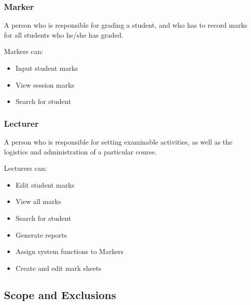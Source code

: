 \documentclass[a4paper]{article}
\begin{document}
			\subsubsection{Marker}
				\begin{flushleft}
				A person who is responsible for grading a student, and who has to record marks for all students who he/she has graded. \linebreak 
				
				Markers can:
				\end{flushleft}
				\begin{itemize}

					\item{Input student marks}
					
					\item{View session marks}
					
					\item{Search for student}

				\end{itemize}
				
			\subsubsection{Lecturer}
				\begin{flushleft}
				A person who is responsible for setting examinable activities, as well as the logistics and administration of a particular course. \linebreak 
				
				Lecturers can:
				\end{flushleft}
				\begin{itemize}

					\item{Edit student marks}
					
					\item{View all marks}
					
					\item{Search for student}
					
					\item{Generate reports}
					
					\item{Assign system functions to Markers}
					
					\item{Create and edit mark sheets}

				\end{itemize}
			\subsection{Scope and Exclusions}
\end{document}
